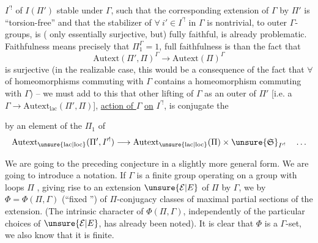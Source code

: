 
$I^{\prime!}$ of $I(\Pi')$ stable under $\Gamma$, such that the corresponding extension of $\Gamma$ by $\Pi'$ is ``torsion-free'' and that the stabilizer of $\forall\ i'\in I^{\prime!}$ in $\Gamma$ is nontrivial, to outer $\Gamma$-groups, is ( only essentially surjective, but) fully faithful, is already problematic. Faithfulness means precisely that $\Pi_1^\Gamma=1$, full faithfulness is  than the fact that 
\[
\mathrm{Autext}(\Pi',\Pi)^\Gamma\longrightarrow\mathrm{Autext}(\Pi)^\Gamma
\]
is surjective (in the realizable case, this  would be a consequence of the fact that $\forall$  of homeomorphisms commuting with $\Gamma$ contains a homeomorphism commuting with $\Gamma$)
-- we must add to this that  other lifting of $\Gamma$ as an outer  of $\Pi'$ [i.e. a $\Gamma\longrightarrow\mathrm{Autext}_{\mathrm{lac}}(\Pi',\Pi)$],    \uline{action of $\Gamma$} \uline{on} $I^{\prime!}$, is conjugate  the 

 by an element of the  $\Pi_1$ of
\[
\mathrm{Autext}_{\unsure{\mathrm{lac}|\mathrm{loc}}}(\Pi',I^{\prime!})
\longrightarrow
\mathrm{Autext}_{\unsure{\mathrm{lac}|\mathrm{loc}}}(\Pi)
\times \unsure{\mathfrak S}_{I^{\prime!}}\quad\ldots
\]

We are going to  the preceding conjecture in a slightly more general form.
We are going to introduce a notation. If $\Gamma$ is a finite group operating 
 on a group with loops $\Pi$ ,
giving rise to an extension $\unsure{\mathcal E|E}$ of $\Pi$ by $\Gamma$,
we   by $\Phi=\Phi(\Pi,\Gamma)$ (``fixed '')
 of $\Pi$-conjugacy classes of maximal partial sections
 of the extension.
(The intrinsic character of $\Phi(\Pi,\Gamma)$, independently of the particular choices of $\unsure{\mathcal E|E}$, has already been noted).
It is clear that $\Phi$ is a $\Gamma$-set, we also know that it is finite.

